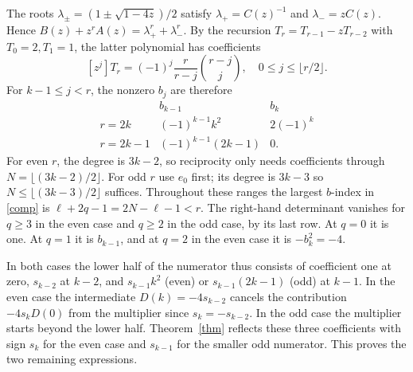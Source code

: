 \documentclass[11pt]{article}
\begin{document}
The roots $\lambda_\pm=(1\pm\sqrt{1-4z})/2$ satisfy $\lambda_+=C(z)^{-1}$ and $\lambda_-=zC(z)$. Hence $B(z)+z^r A(z)=\lambda_+^r+\lambda_-^r$. By the recursion $T_r=T_{r-1}-zT_{r-2}$ with $T_0=2,T_1=1$, the latter polynomial has coefficients
\[
 [z^j]T_r=(-1)^j\frac{r}{r-j}\binom{r-j}{j},\quad
 0\le j\le\lfloor r/2\rfloor .
\]
For $k-1\le j<r$, the nonzero $b_j$ are therefore
\[
 \begin{array}{c|cc}
   & b_{k-1}& b_k\\\hline
 r=2k   &(-1)^{k-1}k^2&2(-1)^k\\
 r=2k-1 &(-1)^{k-1}(2k-1)&0 .
 \end{array}
\]
For even $r$, the degree is $3k-2$, so reciprocity only needs coefficients through $N=\lfloor(3k-2)/2\rfloor$. For odd $r$ use $e_0$ first; its degree is $3k-3$ so $N\le\lfloor(3k-3)/2\rfloor$ suffices. Throughout these ranges the largest $b$-index in \eqref{comp} is $\ell+2q-1=2N-\ell-1<r$. The right-hand determinant vanishes for $q\ge3$ in the even case and $q\ge2$ in the odd case, by its last row. At $q=0$ it is one. At $q=1$ it is $b_{k-1}$, and at $q=2$ in the even case it is $-b_k^2=-4$.

In both cases the lower half of the numerator thus consists of coefficient one at zero, $s_{k-2}$ at $k-2$, and $s_{k-1}k^2$ (even) or $s_{k-1}(2k-1)$ (odd) at $k-1$. In the even case the intermediate $D(k)=-4s_{k-2}$ cancels the contribution $-4s_kD(0)$ from the multiplier since $s_k=-s_{k-2}$. In the odd case the multiplier starts beyond the lower half. Theorem~\ref{thm} reflects these three coefficients with sign $s_k$ for the even case and $s_{k-1}$ for the smaller odd numerator. This proves the two remaining expressions.
\end{document}
